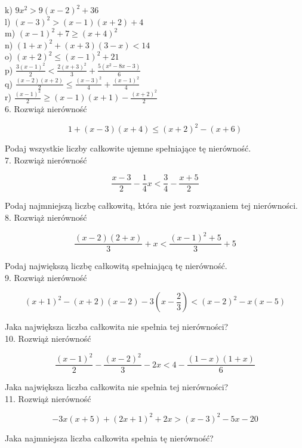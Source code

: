 \documentclass[10pt]{article}
\begin{document}
k) \(9 x^{2}>9(x-2)^{2}+36\)\\
l) \((x-3)^{2}>(x-1)(x+2)+4\)\\
m) \((x-1)^{2}+7 \geqslant(x+4)^{2}\)\\
n) \((1+x)^{2}+(x+3)(3-x)<14\)\\
o) \((x+2)^{2} \leqslant(x-1)^{2}+21\)\\
p) \(\frac{3(x-1)^{2}}{2}<\frac{2(x+3)^{2}}{3}+\frac{5\left(x^{2}-8 x-3\right)}{6}\)\\
q) \(\frac{(x-2)(x+2)}{2} \leqslant \frac{(x-3)^{2}}{4}+\frac{(x-1)^{2}}{4}\)\\
r) \(\frac{(x-1)^{2}}{2} \geqslant(x-1)(x+1)-\frac{(x+2)^{2}}{2}\)\\
6. Rozwiąż nierówność

\[
1+(x-3)(x+4) \leqslant(x+2)^{2}-(x+6)
\]

Podaj wszystkie liczby całkowite ujemne spełniające tę nierówność.\\
7. Rozwiąż nierówność

\[
\frac{x-3}{2}-\frac{1}{4} x<\frac{3}{4}-\frac{x+5}{2}
\]

Podaj najmniejszą liczbę całkowitą, która nie jest rozwiązaniem tej nierówności.\\
8. Rozwiąż nierówność

\[
\frac{(x-2)(2+x)}{3}+x<\frac{(x-1)^{2}+5}{3}+5
\]

Podaj największą liczbę całkowitą spełniającą tę nierówność.\\
9. Rozwiąż nierówność

\[
(x+1)^{2}-(x+2)(x-2)-3\left(x-\frac{2}{3}\right)<(x-2)^{2}-x(x-5)
\]

Jaka największa liczba całkowita nie spełnia tej nierówności?\\
10. Rozwiąż nierówność

\[
\frac{(x-1)^{2}}{2}-\frac{(x-2)^{2}}{3}-2 x<4-\frac{(1-x)(1+x)}{6}
\]

Jaka największa liczba całkowita nie spełnia tej nierówności?\\
11. Rozwiąż nierówność

\[
-3 x(x+5)+(2 x+1)^{2}+2 x>(x-3)^{2}-5 x-20
\]

Jaka najmniejsza liczba całkowita spełnia tę nierówność?
\end{document}
